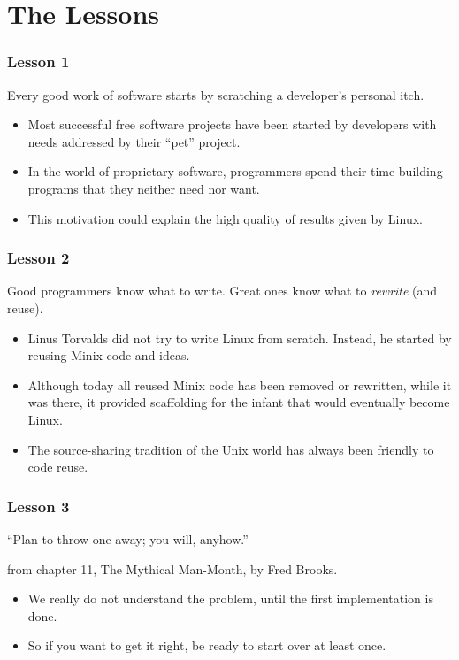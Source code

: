 \documentclass{beamer}
\begin{document}
\section{The Lessons}

\begin{frame}
\frametitle{Lesson 1}

\begin{center}
{\large Every good work of software starts by scratching a developer's
  personal itch.}
\end{center}

\begin{itemize}
\item Most successful free software projects have been started by developers
with needs addressed by their ``pet'' project.
\item In the world of proprietary software, programmers spend their
  time building programs that they neither need nor want.
\item This motivation could explain the high quality of results given
  by Linux.
\end{itemize}

\end{frame}

\begin{frame}
\frametitle{Lesson 2}

\begin{center}
{\large Good programmers know what to write. Great ones know what to
  \textit{rewrite} (and reuse).}
\end{center}

\begin{itemize}
\item Linus Torvalds did not try to write Linux from scratch. Instead,
  he started by reusing Minix code and ideas.
\item Although today all
  reused Minix code has been removed or rewritten, while it was there,
  it provided scaffolding for the infant that would eventually become
  Linux.
\item The source-sharing tradition of the Unix world has always been
  friendly to code reuse.
\end{itemize}

\end{frame}

\begin{frame}
\frametitle{Lesson 3}

\begin{center}
{\large ``Plan to throw one away; you will, anyhow.''}
\end{center}
from chapter 11, The Mythical Man-Month, by Fred Brooks.

\begin{itemize}
\item We really do not understand the problem, until the first
  implementation is done.
\item So if you want to get it right, be ready to start over at least once.
\end{itemize}

\end{frame}
\end{document}
